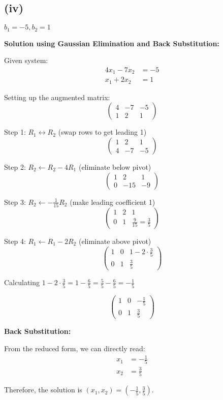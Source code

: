 \subsection*{(iv)} $b_1 = -5, b_2 = 1$

\textbf{Solution using Gaussian Elimination and Back Substitution:}

Given system:
\begin{align}
	4x_1 - 7x_2 & = -5 \\
	x_1 + 2x_2  & = 1
\end{align}

Setting up the augmented matrix:
\[
	\left(\begin{array}{cc|c}
			4 & -7 & -5 \\
			1 & 2  & 1
		\end{array}\right)
\]

Step 1: $R_1 \leftrightarrow R_2$ (swap rows to get leading 1)
\[
	\left(\begin{array}{cc|c}
			1 & 2  & 1  \\
			4 & -7 & -5
		\end{array}\right)
\]

Step 2: $R_2 \leftarrow R_2 - 4R_1$ (eliminate below pivot)
\[
	\left(\begin{array}{cc|c}
			1 & 2   & 1  \\
			0 & -15 & -9
		\end{array}\right)
\]

Step 3: $R_2 \leftarrow -\frac{1}{15}R_2$ (make leading coefficient 1)
\[
	\left(\begin{array}{cc|c}
			1 & 2 & 1                          \\
			0 & 1 & \frac{9}{15} = \frac{3}{5}
		\end{array}\right)
\]

Step 4: $R_1 \leftarrow R_1 - 2R_2$ (eliminate above pivot)
\[
	\left(\begin{array}{cc|c}
			1 & 0 & 1 - 2 \cdot \frac{3}{5} \\
			0 & 1 & \frac{3}{5}
		\end{array}\right)
\]

Calculating $1 - 2 \cdot \frac{3}{5} = 1 - \frac{6}{5} = \frac{5}{5} - \frac{6}{5} = -\frac{1}{5}$

\[
	\left(\begin{array}{cc|c}
			1 & 0 & -\frac{1}{5} \\
			0 & 1 & \frac{3}{5}
		\end{array}\right)
\]

\textbf{Back Substitution:}

From the reduced form, we can directly read:
\begin{align*}
	x_1 & = -\frac{1}{5} \\
	x_2 & = \frac{3}{5}
\end{align*}

Therefore, the solution is $\boxed{\left(x_1, x_2\right) = \left(-\frac{1}{5}, \frac{3}{5}\right)}$.